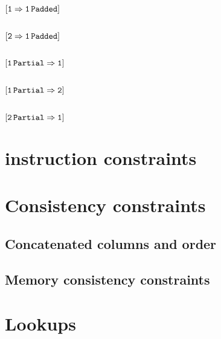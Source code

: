 \subsection{\excision{}}               
\subsection{$\operatorname{\mathtt{[1\Rightarrow1\,Padded]}}$}         
\subsection{$\operatorname{\mathtt{[2\Rightarrow1\,Padded]}}$}         
\subsection{$\operatorname{\mathtt{[1\,Partial\Rightarrow1]}}$}        
\subsection{$\operatorname{\mathtt{[1\,Partial\Rightarrow2]}}$}        
\subsection{$\operatorname{\mathtt{[2\,Partial\Rightarrow1]}}$}        


\section{\mmioMod{} instruction constraints}  
           
\section{Consistency constraints}
\subsection{Concatenated columns and order}       
\subsection{Memory consistency constraints}       

\section{Lookups} 
